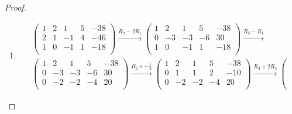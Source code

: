 \documentclass[prb,12pt]{revtex4-2}
\theoremstyle{definition}
\theoremstyle{definition}
\newenvironment{parts}{\begin{enumerate}[label=(\alph*)]}{\end{enumerate}}
\newcommand{\R}{\mathbb{R}}
\begin{document}
\begin{proof}
\begin{parts}
\[	.\]
	Sei dann $(x_1,x_2,x_3,x_4)^T\in \R^4$. Wenn $(x_1,x_2,x_3,x_4)^T\in \ker(A)$, gilt
	\begin{align*}
		t_3&:= x_3\\
		t_4&:= x_4\\
		x_1&=x_3-x_4=t_3-t_4\\
		x_2&=-x_3-2x_4=-t_3-2t_4
	\end{align*}
	Daraus folgt:
	\begin{align*}
	\ker(A)=\text{span}\left\{ \begin{pmatrix} 1 \\ -1 \\ 1 \\ 0 \end{pmatrix} ,\begin{pmatrix} -1 \\ -2 \\ 0 \\ 1 \end{pmatrix}  \right\} 
	\end{align*}	
\item 
	\begin{gather*}
\left(
\begin{array}{cccc|c}
 1 & 2 & 1 & 5 & -38 \\
 2 & 1 & -1 & 4 & -46 \\
 1 & 0 & -1 & 1 & -18 \\
\end{array}
\right) \xrightarrow{R_2-2R_1} \left(
\begin{array}{cccc|c}
 1 & 2 & 1 & 5 & -38 \\
 0 & -3 & -3 & -6 & 30 \\
 1 & 0 & -1 & 1 & -18 \\
\end{array}
\right) \xrightarrow{R_3-R_1}\\\left(
\begin{array}{cccc|c}
 1 & 2 & 1 & 5 & -38 \\
 0 & -3 & -3 & -6 & 30 \\
 0 & -2 & -2 & -4 & 20 \\
\end{array}
\right) \xrightarrow{R_2\times -\frac{1}{3}} \left(
\begin{array}{cccc|c}
 1 & 2 & 1 & 5 & -38 \\
 0 & 1 & 1 & 2 & -10 \\
 0 & -2 & -2 & -4 & 20 \\
\end{array}
\right) \xrightarrow{R_3+2R_2} \left(

\end{gather*}
\end{parts}
\end{proof}
\end{document}

